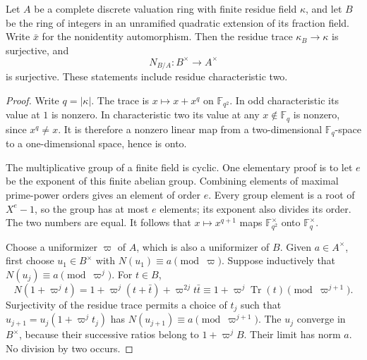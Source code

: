 \begin{lemma}
\label{acl-local-norm}
Let $A$ be a complete discrete valuation ring with finite residue
field $\kappa$, and let $B$ be the ring of integers in an unramified
quadratic extension of its fraction field. Write $\bar x$ for the
nonidentity automorphism. Then the residue trace
$\kappa_B\to\kappa$ is surjective, and
\[
                         N_{B/A}:B^\times\longrightarrow A^\times
\]
is surjective. These statements include residue characteristic two.
\end{lemma}
\begin{proof}
Write $q=|\kappa|$. The trace is $x\mapsto x+x^q$ on
$\mathbb F_{q^2}$. In odd characteristic its value at $1$ is
nonzero. In characteristic two its value at any
$x\notin\mathbb F_q$ is nonzero, since $x^q\ne x$.
It is therefore a nonzero linear map from a two-dimensional
$\mathbb F_q$-space to a one-dimensional space, hence is onto.

The multiplicative group of a finite field is cyclic. One elementary
proof is to let $e$ be the exponent of this finite abelian group.
Combining elements of maximal prime-power orders gives an element
of order $e$. Every group element is a root of $X^e-1$, so the
group has at most $e$ elements; its exponent also divides its
order. The two numbers are equal. It follows that
$x\mapsto x^{q+1}$ maps $\mathbb F_{q^2}^\times$ onto
$\mathbb F_q^\times$.

Choose a uniformizer $\varpi$ of $A$, which is also a uniformizer
of $B$. Given $a\in A^\times$, first choose $u_1\in B^\times$
with $N(u_1)\equiv a\pmod\varpi$. Suppose inductively that
$N(u_j)\equiv a\pmod{\varpi^j}$. For $t\in B$,
\[
 N(1+\varpi^jt)
  =1+\varpi^j(t+\bar t)+\varpi^{2j}t\bar t
  \equiv1+\varpi^j\operatorname{Tr}(t)
                                     \pmod{\varpi^{j+1}}.
\]
Surjectivity of the residue trace permits a choice of $t_j$
such that $u_{j+1}=u_j(1+\varpi^jt_j)$ has
$N(u_{j+1})\equiv a\pmod{\varpi^{j+1}}$.
The $u_j$ converge in $B^\times$, because their successive
ratios belong to $1+\varpi^jB$. Their limit has norm $a$.
No division by two occurs.
\end{proof}

